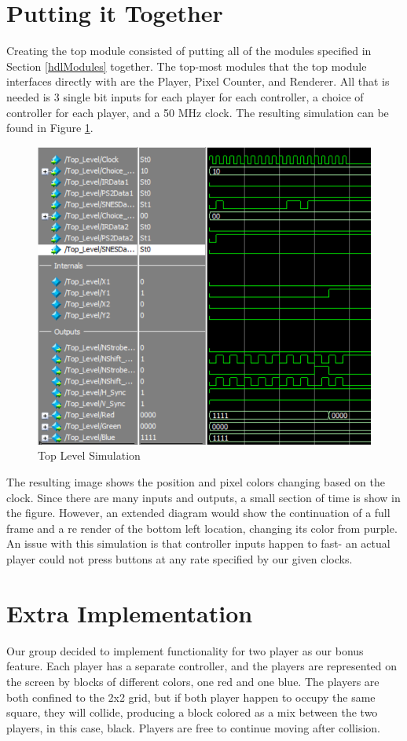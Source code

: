 \documentclass[]{article}
\begin{document}
\section{Putting it Together}
Creating the top module consisted of putting all of the modules specified in Section \ref{hdlModules} together.
The top-most modules that the top module interfaces directly with are the Player, Pixel Counter, and Renderer.
All that is needed is 3 single bit inputs for each player for each controller, a choice of controller for each player,
and a 50 MHz clock. The resulting simulation can be found in Figure \ref{fig:topSim}.
\begin{figure}[H]\centering
    \includegraphics[width=\linewidth]{figures/Top_Sim.png}
    \caption{Top Level Simulation}
    \label{fig:topSim}
\end{figure}
The resulting image shows the position and pixel colors changing based on the clock.
Since there are many inputs and outputs, a small section of time is show in the figure.
However, an extended diagram would show the continuation of a full frame and a re render of the bottom left location, changing its color from purple.
An issue with this simulation is that controller inputs happen to fast- an actual player could not press buttons at any rate specified by our given clocks.

\section{Extra Implementation}
Our group decided to implement functionality for two player as our bonus feature.
Each player has a separate controller, and the players are represented on the screen by blocks of different colors, one red and one blue.
The players are both confined to the 2x2 grid, but if both player happen to occupy the same square, they will collide, producing a block colored as a mix between the two players,
in this case, black. Players are free to continue moving after collision.
\end{document}
